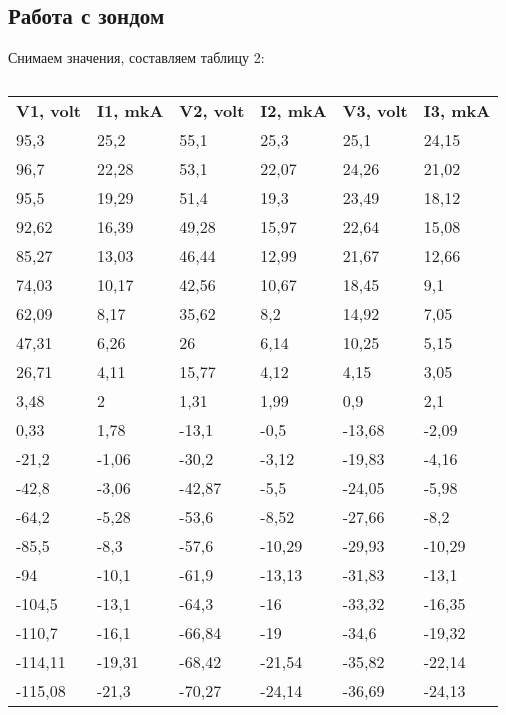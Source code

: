 \documentclass[a4paper,12pt]{article}
\begin{document}
\subsection{Работа с зондом}
Снимаем значения, составляем таблицу 2:
\begin{table}[]
    \caption{}
    \centering
    \label{tab:my-table}
    \begin{tabular}{|l|l|l|l|l|l|}
        \hline
    \textbf{V1, volt} & \textbf{I1, mkA} & \textbf{V2, volt} & \textbf{I2, mkA} & \textbf{V3, volt} & \textbf{I3, mkA}\\
    95,3  & 25,2  & 55,1   & 25,3   & 25,1   & 24,15  \\ \hline
    96,7  & 22,28 & 53,1   & 22,07  & 24,26  & 21,02  \\\hline
    95,5  & 19,29 & 51,4   & 19,3   & 23,49  & 18,12  \\\hline
    92,62 & 16,39 & 49,28  & 15,97  & 22,64  & 15,08  \\\hline
    85,27 & 13,03 & 46,44  & 12,99  & 21,67  & 12,66  \\\hline
    74,03 & 10,17 & 42,56  & 10,67  & 18,45  & 9,1    \\\hline
    62,09 & 8,17  & 35,62  & 8,2    & 14,92  & 7,05   \\\hline
    47,31 & 6,26  & 26     & 6,14   & 10,25  & 5,15   \\\hline
    26,71 & 4,11  & 15,77  & 4,12   & 4,15   & 3,05   \\\hline
    3,48  & 2     & 1,31   & 1,99   & 0,9    & 2,1    \\\hline
    0,33  & 1,78  & -13,1  & -0,5   & -13,68 & -2,09  \\\hline
    -21,2 & -1,06 & -30,2  & -3,12  & -19,83 & -4,16  \\\hline
    -42,8 & -3,06 & -42,87 & -5,5   & -24,05 & -5,98  \\\hline
    -64,2 & -5,28 & -53,6  & -8,52  & -27,66 & -8,2   \\\hline
    -85,5 & -8,3  & -57,6  & -10,29 & -29,93 & -10,29 \\ \hline
    -94     & -10,1  & -61,9  & -13,13 & -31,83 & -13,1  \\ \hline
-104,5  & -13,1  & -64,3  & -16    & -33,32 & -16,35 \\\hline
-110,7  & -16,1  & -66,84 & -19    & -34,6  & -19,32 \\\hline
-114,11 & -19,31 & -68,42 & -21,54 & -35,82 & -22,14 \\\hline
-115,08 & -21,3  & -70,27 & -24,14 & -36,69 & -24,13 \\\hline
    \end{tabular}
    \end{table}
\end{document}
